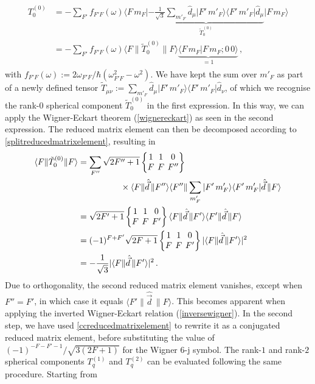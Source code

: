 \documentclass[../Thesis-IJspeert.tex]{subfiles}
\begin{document}
\begin{align}
\begin{split}
T^{(0)}_0&=-\sum_{F'}f_{F'F}(\omega) \langle F\, m_F \vert \underbrace{-\frac{1}{\sqrt{3}} \sum_{m'_F} \hat{d}_\mu \vert F'\, m'_F \rangle\langle F'\, m'_F \vert \hat{d}_\mu }_{\tilde{T}^{(0)}_0}  \vert F\, m_F \rangle\\&= -\sum_{F'}f_{F'F}(\omega) \langle F\| \tilde{T}^{(0)}_0 \| F \rangle \underbrace{\langle F\, m_F \vert F\, m_F ; 0\,0 \rangle }_{=1} \,,
\end{split}
\end{align}
with $f_{F'F}(\omega):= {2\omega_{F' F} }/{\hbar (\omega_{F' F}^2-\omega^2)}$. We have kept the sum over $m'_F$ as part of a newly defined tensor $\tilde{T}_{\mu\nu}:=\sum_{m'_F} \hat{d}_\mu \vert F'\, m'_F \rangle\langle F'\, m'_F \vert \hat{d}_\nu$, of which we recognise the rank-$0$ spherical component $\tilde{T}^{(0)}_0$ in the first expression. In this way, we can apply the Wigner-Eckart theorem (\autoref{wignereckart}) as seen in the second expression. The reduced matrix element can then be decomposed according to \autoref{splitreducedmatrixelement}, resulting in
\begin{align}
\begin{split}
 \langle F\| \tilde{T}^{(0)}_0 \| F \rangle &= \sum_{F''}\sqrt{2F''+1} \tj{1}{1}{0}{F}{F}{F''}\\ &\hspace{5em}\times \langle F\| \hat{\vec{d}} \, \| F'' \rangle \langle F''\| \sum_{m'_F} \vert F'\, m'_F \rangle\langle F'\, m'_F \vert \hat{\vec{d}} \, \| F \rangle \\ &= \sqrt{2F'+1} \tj{1}{1}{0}{F}{F}{F'} \langle F\| \hat{\vec{d}} \, \| F' \rangle \langle F'\| \hat{\vec{d}} \, \| F \rangle \\ &= (-1)^{F+F'}\sqrt{2F+1} \tj{1}{1}{0}{F}{F}{F'} \lvert \langle{F}\| \hat{\vec{d}} \, \|{F'}\rangle\rvert^2 \\ &=-\frac{1}{\sqrt{3}} \lvert \langle{F}\| \hat{\vec{d}} \, \|{F'}\rangle\rvert^2\,.
 \end{split}
\end{align}
Due to orthogonality, the second reduced matrix element vanishes, except when $F''=F'$, in which case it equals $\langle{F'}\| \hat{\vec{d}} \, \|{F}\rangle$. This becomes apparent when applying the inverted Wigner-Eckart relation (\autoref{inversewigner}). In the second step, we have used \autoref{ccreducedmatrixelement} to rewrite it as a conjugated reduced matrix element, before substituting the value of $(-1)^{-F-F'-1}/\sqrt{3(2F+1)}$ for the Wigner 6-j symbol. The rank-$1$ and rank-$2$ spherical components $T^{(1)}_q$ and $T^{(2)}_q$ can be evaluated following the same procedure. Starting from
\end{document}
